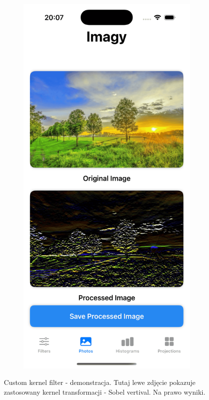 \documentclass[a4paper]{article}
\begin{document}
\begin{figure}[H]
\begin{subfigure}{0.2\textwidth}
        \label{fig:dog_custom_horizontal}
    \end{subfigure}
    \hfill
    \begin{subfigure}{0.2\textwidth}
        \centering
        \includegraphics[width=\linewidth]{images/trees_custom_horizontal.png}
        \label{fig:trees_custom_horizontal}
    \end{subfigure}
    \caption{Custom kernel filter - demonstracja. Tutaj lewe zdjęcie pokazuje zastosowany kernel transformacji - Sobel vertival. Na prawo wyniki.}
    \label{fig:custom_horizontal}
\end{figure}
\end{document}
